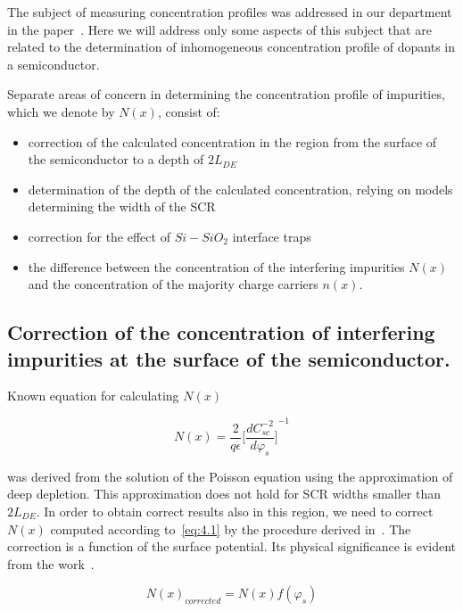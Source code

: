 The subject of measuring concentration profiles was addressed in our
department in the paper~\cite{4.6}. Here we will address only some
aspects of this subject that are related to the determination of
inhomogeneous concentration profile of dopants in a semiconductor.

\par Separate areas of concern in determining the concentration
profile of impurities, which we denote by $N(x)$, consist of:

\begin{itemize}
\item correction of the calculated concentration in the region from
  the surface of the semiconductor to a depth of $2L_{DE}$~\cite{4.7,
    4.8}
\item determination of the depth of the calculated concentration,
  relying on models determining the width of the SCR~\cite{4.9, 4.10,
    4.11}
\item correction for the effect of $Si-SiO_2$ interface
  traps~\cite{4.12}
\item the difference between the concentration of the interfering
  impurities $N(x)$ and the concentration of the majority charge
  carriers $n(x)$.
\end{itemize}

\subsection[Correction of the concentration of interfering impurities]{Correction of the concentration of interfering impurities at the surface of the semiconductor.}\label{sec:4.1.1}

Known equation for calculating $N(x)$~\cite{I.2}

\begin{equation}\label{eq:4.1}
  N(x) = {\frac{2}{q\epsilon}} {\Bigg[\frac{dC_{sc}^{-2}}{d\varphi_{s}}\Bigg]}^{-1}
\end{equation}

was derived from the solution of the Poisson equation using the
approximation of deep depletion. This approximation does not hold for
SCR widths smaller than $2L_{DE}$. In order to obtain correct results
also in this region, we need to correct $N(x)$ computed according
to~\ref{eq:4.1} by the procedure derived in~\cite{4.7, 4.8}.  The
correction is a function of the surface potential. Its physical
significance is evident from the work~\cite{4.7}.

\begin{equation}\label{eq:4.2}
  {N(x)}_{corrected} = N(x)f(\varphi_{s})
\end{equation}

